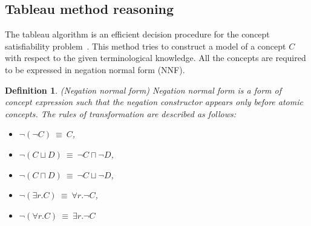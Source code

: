 \documentclass{article}
\newtheorem{mydef}{Definition}
\begin{document}
\subsection{Tableau method reasoning}\label{sec:reasoning}
The tableau algorithm is an efficient decision procedure for the concept satisfiability problem~\cite{baader2001overview,gore2007exptime,nguyen2009efficient}.
This method tries to construct a model of a concept $C$ with respect to the given terminological knowledge. 
All the concepts are required to be expressed in negation normal form (NNF). 
\begin{mydef}(Negation normal form)
Negation normal form is a form of concept expression such that the negation constructor appears only before atomic concepts.
The rules of transformation are described as follows:
\begin{itemize}
\item  $\neg(\neg C) ~\equiv~ C$,
\item $\neg(C\sqcup D) ~\equiv~ \neg C \sqcap \neg D$,
\item $\neg(C\sqcap D) ~\equiv~ \neg C \sqcup \neg D$,
\item $\neg(\exists r.C) ~\equiv~ \forall r.\neg C$,
\item $\neg(\forall r.C) ~\equiv~  \exists r.\neg C$
\end{itemize}
\end{mydef}
\end{document}
